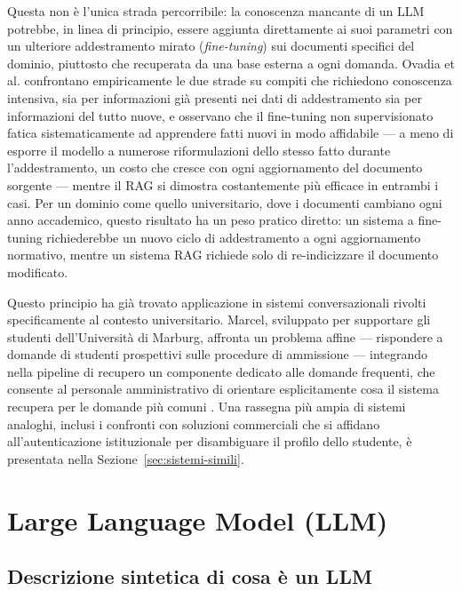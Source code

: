 Questa non è l'unica strada percorribile: la conoscenza mancante di un LLM potrebbe, in linea di principio, essere
aggiunta direttamente ai suoi parametri con un ulteriore addestramento mirato (\emph{fine-tuning}) sui documenti
specifici del dominio, piuttosto che recuperata da una base esterna a ogni domanda. Ovadia et al.
\cite{ovadia2024finetuning} confrontano empiricamente le due strade su compiti che richiedono conoscenza intensiva,
sia per informazioni già presenti nei dati di addestramento sia per informazioni del tutto nuove, e osservano che il
fine-tuning non supervisionato fatica sistematicamente ad apprendere fatti nuovi in modo affidabile --- a meno di
esporre il modello a numerose riformulazioni dello stesso fatto durante l'addestramento, un costo che cresce con
ogni aggiornamento del documento sorgente --- mentre il RAG si dimostra costantemente più efficace in entrambi i
casi. Per un dominio come quello universitario, dove i documenti cambiano ogni anno accademico, questo risultato ha
un peso pratico diretto: un sistema a fine-tuning richiederebbe un nuovo ciclo di addestramento a ogni aggiornamento
normativo, mentre un sistema RAG richiede solo di re-indicizzare il documento modificato.

Questo principio ha già trovato applicazione in sistemi conversazionali rivolti specificamente al contesto
universitario. Marcel, sviluppato per supportare gli studenti dell'Università di Marburg, affronta un problema
affine --- rispondere a domande di studenti prospettivi sulle procedure di ammissione --- integrando nella pipeline
di recupero un componente dedicato alle domande frequenti, che consente al personale amministrativo di orientare
esplicitamente cosa il sistema recupera per le domande più comuni \cite{trienes2025marcel}. Una rassegna più ampia di
sistemi analoghi, inclusi i confronti con soluzioni commerciali che si affidano all'autenticazione istituzionale per
disambiguare il profilo dello studente, è presentata nella Sezione~\ref{sec:sistemi-simili}.

\section{Large Language Model (LLM)}

\subsection{Descrizione sintetica di cosa è un LLM}
\label{subsec:llm-desc}

